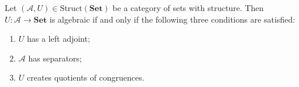 Let $(\mathcal{A}, U) \in \text{Struct}(\mathbf{Set})$ be a category of sets with structure. Then $U: \mathcal{A} \longrightarrow \mathbf{Set}$ is algebraic if and only if the following three conditions are satisfied:
\begin{enumerate}
\item $U$ has a left adjoint;
\item $\mathcal{A}$ has separators;
\item $U$ creates quotients of congruences.
\end{enumerate}
